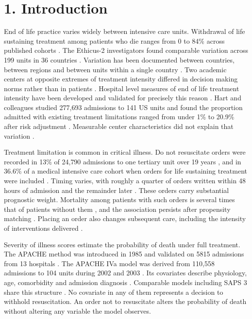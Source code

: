 \documentclass[12pt,a4paper]{article}
\begin{document}
\newpage
\section*{1. Introduction}

End of life practice varies widely between intensive care units. Withdrawal of
life sustaining treatment among patients who die ranges from 0 to 84\% across
published cohorts \cite{ref1}. The Ethicus-2 investigators found comparable
variation across 199 units in 36 countries \cite{ref2}. Variation has been
documented between countries, between regions and between units within a single
country \cite{ref1,ref3,ref4}. Two academic centers at opposite extremes of
treatment intensity differed in decision making norms rather than in patients
\cite{ref5}. Hospital level measures of end of life treatment intensity have
been developed and validated for precisely this reason \cite{ref6}. Hart and
colleagues studied 277{,}693 admissions to 141 US units and found the proportion
admitted with existing treatment limitations ranged from under 1\% to 20.9\%
after risk adjustment \cite{ref7}. Measurable center characteristics did not
explain that variation \cite{ref7}.

Treatment limitation is common in critical illness. Do not resuscitate orders
were recorded in 13\% of 24{,}790 admissions to one tertiary unit over 19 years
\cite{ref8}, and in 36.6\% of a medical intensive care cohort when orders for
life sustaining treatment were included \cite{ref9}. Timing varies, with roughly
a quarter of orders written within 48 hours of admission and the remainder later
\cite{ref10}. These orders carry substantial prognostic weight. Mortality among
patients with such orders is several times that of patients without them
\cite{ref9,ref11}, and the association persists after propensity matching
\cite{ref12}. Placing an order also changes subsequent care, including the
intensity of interventions delivered \cite{ref13}.

Severity of illness scores estimate the probability of death under full
treatment. The APACHE method was introduced in 1985 and validated on 5815 admissions
from 13 hospitals \cite{ref14}. The APACHE IVa model was derived from 110{,}558
admissions to 104 units during 2002 and 2003 \cite{ref15}. Its covariates describe physiology, age, comorbidity and admission
diagnosis \cite{ref15}. Comparable models including SAPS 3 share this structure
\cite{ref16,ref17}. No covariate in any of them represents a decision to withhold
resuscitation. An order not to resuscitate alters the probability of death
without altering any variable the model observes.
\end{document}
